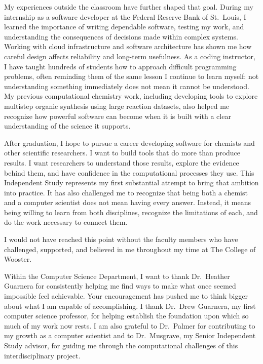 My experiences outside the classroom have further shaped that goal.
During my internship as a software developer at the Federal Reserve
Bank of St.~Louis, I learned the importance of writing dependable
software, testing my work, and understanding the consequences of
decisions made within complex systems. Working with cloud infrastructure
and software architecture has shown me how careful design affects
reliability and long-term usefulness. As a coding instructor, I have
taught hundreds of students how to approach difficult programming
problems, often reminding them of the same lesson I continue to learn
myself: not understanding something immediately does not mean it cannot
be understood. My previous computational chemistry work, including
developing tools to explore multistep organic synthesis using large
reaction datasets, also helped me recognize how powerful software can
become when it is built with a clear understanding of the science it
supports.

After graduation, I hope to pursue a career developing software for
chemists and other scientific researchers. I want to build tools that
do more than produce results. I want researchers to understand those
results, explore the evidence behind them, and have confidence in the
computational processes they use. This Independent Study represents my
first substantial attempt to bring that ambition into practice. It has
also challenged me to recognize that being both a chemist and a computer
scientist does not mean having every answer. Instead, it means being
willing to learn from both disciplines, recognize the limitations of
each, and do the work necessary to connect them.

I would not have reached this point without the faculty members who
have challenged, supported, and believed in me throughout my time at
The College of Wooster.

Within the Computer Science Department, I want to thank Dr.~Heather
Guarnera for consistently helping me find ways to make what once seemed
impossible feel achievable. Your encouragement has pushed me to think
bigger about what I am capable of accomplishing. I thank Dr.~Drew
Guarnera, my first computer science professor, for helping establish the
foundation upon which so much of my work now rests. I am also grateful
to Dr.~Palmer for contributing to my growth as a computer scientist and
to Dr.~Musgrave, my Senior Independent Study advisor, for guiding me
through the computational challenges of this interdisciplinary project.

